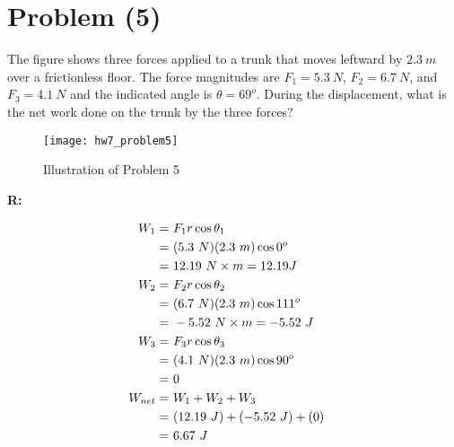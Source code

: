 \section{Problem (5)}
	The figure shows three forces applied to a trunk that moves leftward by $2.3 \ m$ over a frictionless floor. The force magnitudes are $F_{1} = 5.3 \ N$, $F_{2} = 6.7 \ N$, and $F_{3} = 4.1 \ N$ and the indicated angle is $\theta = 69^{o}$. During the displacement, what is the net work done on the trunk by the three forces?

	\begin{figure}[H]
		\begin{center}
			\texttt{[image: hw7\_problem5]}
			\caption{Illustration of Problem 5}
			\label{fig:hw7_problem5}
		\end{center}
	\end{figure}

	\textbf{R:}

	\begin{align}
		W_{1} = \ &F_{1}r \cos \theta_{1}& \notag \\
		= \ &(5.3 \ N)(2.3 \ m) \cos 0^{o}& \notag \\
		= \ &12.19 \ N \times m = 12.19 J& \notag \\
		W_{2} = \ &F_{2}r \cos \theta_{2}& \notag \\
		= \ &(6.7 \ N)(2.3 \ m) \cos 111^{o}& \notag \\
		= \ &-5.52 \ N \times m = -5.52 \ J& \notag \\
		W_{3} = \ &F_{3}r \cos \theta_{3}& \notag \\
		= \ &(4.1 \ N)(2.3 \ m) \cos 90^{o}& \notag \\
		= \ &0& \notag \\
		W_{net} = \ &W_{1} + W_{2} + W_{3}& \notag \\
		= \ &(12.19 \ J) + (-5.52 \ J) + (0)& \notag \\
		= \ &6.67 \ J&
	\end{align}
